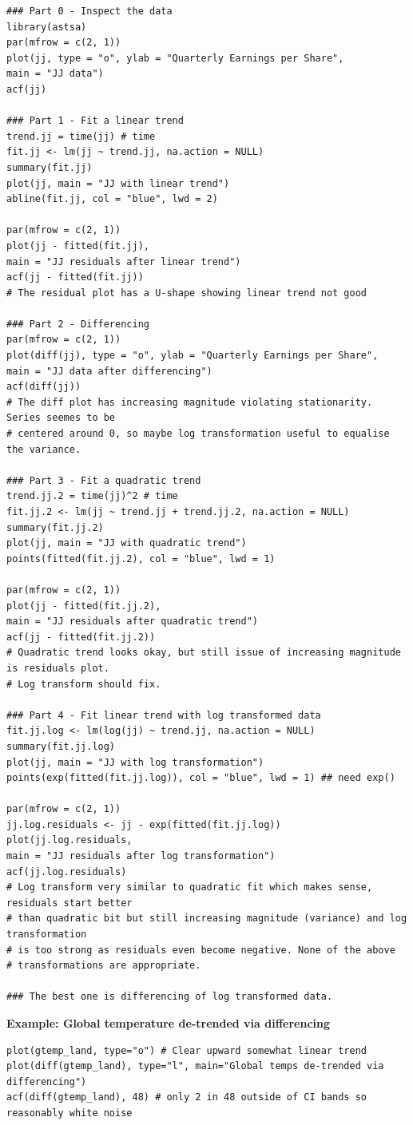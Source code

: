 \documentclass[11pt]{article}
\newcommand{\noi}{\noindent}
\begin{document}
\begin{lstlisting}
### Part 0 - Inspect the data
library(astsa)
par(mfrow = c(2, 1))
plot(jj, type = "o", ylab = "Quarterly Earnings per Share",
main = "JJ data")
acf(jj)

### Part 1 - Fit a linear trend
trend.jj = time(jj) # time
fit.jj <- lm(jj ~ trend.jj, na.action = NULL)
summary(fit.jj)
plot(jj, main = "JJ with linear trend")
abline(fit.jj, col = "blue", lwd = 2)

par(mfrow = c(2, 1))
plot(jj - fitted(fit.jj),
main = "JJ residuals after linear trend")
acf(jj - fitted(fit.jj))
# The residual plot has a U-shape showing linear trend not good

### Part 2 - Differencing
par(mfrow = c(2, 1))
plot(diff(jj), type = "o", ylab = "Quarterly Earnings per Share",
main = "JJ data after differencing")
acf(diff(jj))
# The diff plot has increasing magnitude violating stationarity. Series seemes to be
# centered around 0, so maybe log transformation useful to equalise the variance.

### Part 3 - Fit a quadratic trend
trend.jj.2 = time(jj)^2 # time
fit.jj.2 <- lm(jj ~ trend.jj + trend.jj.2, na.action = NULL)
summary(fit.jj.2)
plot(jj, main = "JJ with quadratic trend")
points(fitted(fit.jj.2), col = "blue", lwd = 1)

par(mfrow = c(2, 1))
plot(jj - fitted(fit.jj.2),
main = "JJ residuals after quadratic trend")
acf(jj - fitted(fit.jj.2))
# Quadratic trend looks okay, but still issue of increasing magnitude is residuals plot.
# Log transform should fix.

### Part 4 - Fit linear trend with log transformed data
fit.jj.log <- lm(log(jj) ~ trend.jj, na.action = NULL)
summary(fit.jj.log)
plot(jj, main = "JJ with log transformation")
points(exp(fitted(fit.jj.log)), col = "blue", lwd = 1) ## need exp()

par(mfrow = c(2, 1))
jj.log.residuals <- jj - exp(fitted(fit.jj.log))
plot(jj.log.residuals,
main = "JJ residuals after log transformation")
acf(jj.log.residuals)
# Log transform very similar to quadratic fit which makes sense, residuals start better
# than quadratic bit but still increasing magnitude (variance) and log transformation
# is too strong as residuals even become negative. None of the above
# transformations are appropriate.

### The best one is differencing of log transformed data.
\end{lstlisting}

\noi \textbf{Example: Global temperature de-trended via differencing}
\begin{lstlisting}
plot(gtemp_land, type="o") # Clear upward somewhat linear trend
plot(diff(gtemp_land), type="l", main="Global temps de-trended via differencing")
acf(diff(gtemp_land), 48) # only 2 in 48 outside of CI bands so reasonably white noise
\end{lstlisting}
\end{document}
